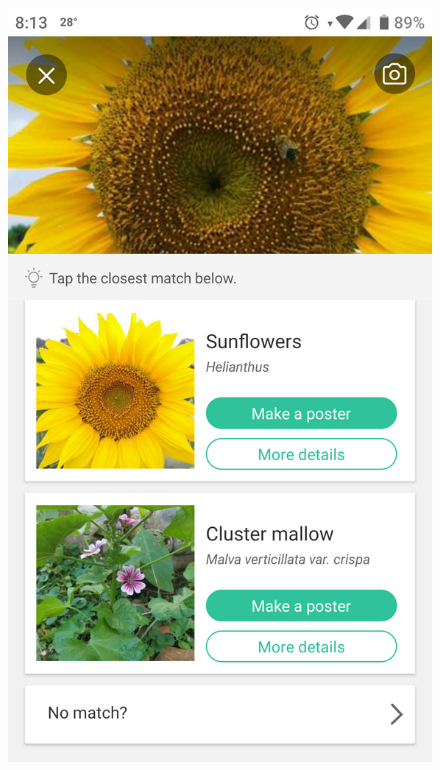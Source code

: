 \documentclass[12pt]{report}
\begin{document}
		\begin{figure}[h]
			\centering
			\includegraphics[scale=0.13]{app_en_1}

\end{figure}
\end{document}
